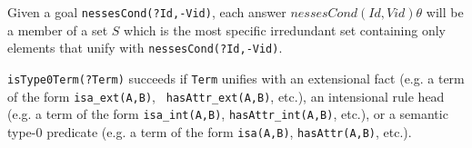 \begin{description}
Given a goal {\tt nessesCond(?Id,-Vid)}, each answer
$nessesCond(Id,Vid)\theta$ will be a member of a set $S$ which is the
most specific irredundant set containing only elements that unify with
{\tt nessesCond(?Id,-Vid)}.  

{\tt isType0Term(?Term)} succeeds if {\tt Term} unifies with an
extensional fact (e.g. a term of the form {\tt isa\_ext(A,B)}, {\tt
hasAttr\_ext(A,B)}, etc.), an intensional rule head (e.g. a term of
the form {\tt isa\_int(A,B)}, {\tt hasAttr\_int(A,B)}, etc.), or a
semantic type-0 predicate (e.g. a term of the form {\tt isa(A,B)},
{\tt hasAttr(A,B)}, etc.).

\end{description}


